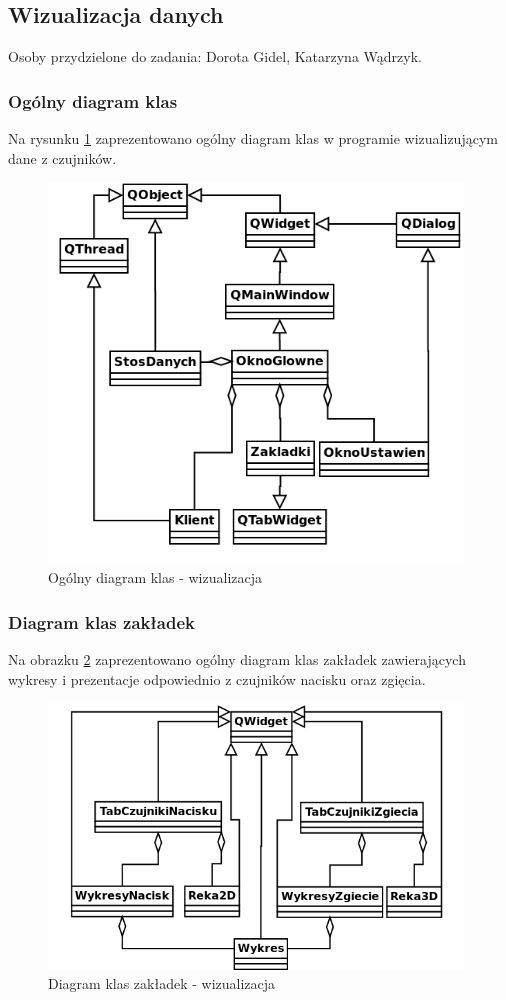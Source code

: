 \documentclass{article}
\begin{document}
\subsection{Wizualizacja danych}
Osoby przydzielone do zadania: Dorota Gidel, Katarzyna Wądrzyk.

\subsubsection{Ogólny diagram klas}
Na rysunku \ref{rys:diagram_ogolny} zaprezentowano ogólny diagram klas w programie wizualizującym dane z czujników.
\begin{figure}[H]
    \centering
    \includegraphics[width=11cm]{diagram_ogolny.png}
    \caption{Ogólny diagram klas - wizualizacja}
    \label{rys:diagram_ogolny}
\end{figure}

\subsubsection{Diagram klas zakładek}
Na obrazku \ref{rys:diagram_klas} zaprezentowano ogólny diagram klas zakładek zawierających wykresy i prezentacje odpowiednio z czujników nacisku oraz zgięcia.
\begin{figure}[H]
    \centering
    \includegraphics[width=11cm]{diagram_klas.png}
    \caption{Diagram klas zakładek - wizualizacja}
    \label{rys:diagram_klas}
\end{figure}
\end{document}
